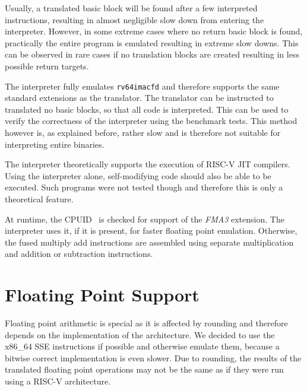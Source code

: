 \documentclass[course=eragp]{aspdoc}
\begin{document}
\par

Usually, a translated basic block will be found after a few interpreted instructions, resulting in almost
negligible slow down from entering the interpreter. However, in some extreme cases where no return
basic block is found, practically the entire program is emulated resulting in extreme slow downs.
This can be observed in rare cases if no translation blocks are created resulting in less possible
return targets.

\par

The interpreter fully emulates \texttt{rv64imacfd} and therefore supports the same standard
extensions as the translator. The translator can be instructed to translated no basic blocks, so
that all code is interpreted. This can be used to verify the
correctness of the interpreter using the benchmark tests. This method however is, as explained
before, rather slow and is therefore not suitable for interpreting entire binaries.

\par

The interpreter theoretically supports the execution of RISC-V JIT compilers. Using the interpreter
alone, self-modifying code should also be able to be executed. Such programs were not tested though and
therefore this is only a theoretical feature.

\par

At runtime, the CPUID~\cite{intel2017man} is checked for support of the \textit{FMA3} extension.
The interpreter uses it, if it is
present, for faster floating point emulation. Otherwise, the fused multiply
add instructions are assembled using separate multiplication and addition or subtraction
instructions.

\par

\section{Floating Point Support}\label{sec:floating_point}

Floating point arithmetic is special as it is affected by rounding and therefore depends on the
implementation of the architecture. We decided to use the x86\_64 SSE instructions if possible and
otherwise emulate them, because a bitwise correct implementation is even slower. Due to rounding, the
results of the translated floating point operations may not be the same as if they were run using a
RISC-V architecture.
\end{document}
